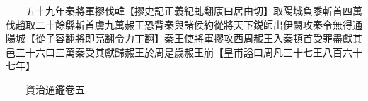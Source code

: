 　　五十九年秦將軍摎伐韓【摎史記正義紀虬翻康曰居由切】取陽城負黍斬首四萬伐趙取二十餘縣斬首虜九萬赧王恐背秦與諸侯約從將天下鋭師出伊闕攻秦令無得通陽城【從子容翻將即亮翻令力丁翻】秦王使將軍摎攻西周赧王入秦頓首受罪盡獻其邑三十六口三萬秦受其獻歸赧王於周是歲赧王崩【皇甫謚曰周凡三十七王八百六十七年】

　　資治通鑑卷五  
    


 


 



 

 
  







 


　　
　　
　
　
　


　　

　















	
	









































 
  



















 





 












  
  
  

 





